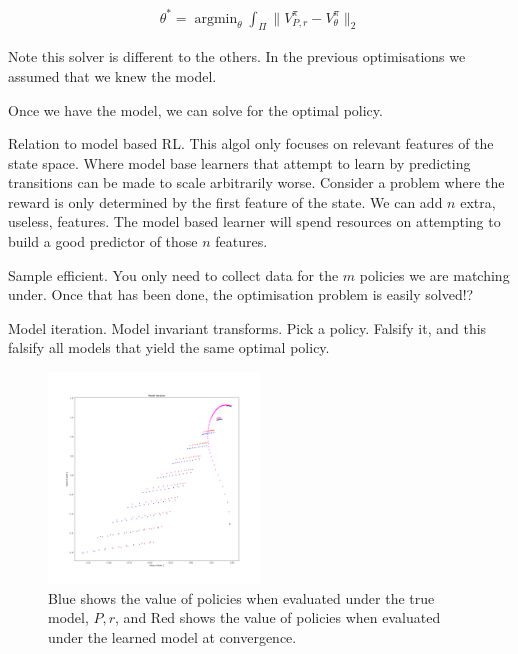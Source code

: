\begin{align}
\theta^{* } = \mathop{\text{argmin}}_{\theta} \int_{\Pi} \parallel V^{\pi}_{P, r} -V^{\pi}_{\theta} \parallel_2
\end{align}

Note this solver is different to the others. In the previous optimisations we assumed that we knew the model.


Once we have the model, we can solve for the optimal policy.

Relation to model based RL. This algol only focuses on relevant features of the state space.
Where model base learners that attempt to learn by predicting transitions can be made to scale arbitrarily worse.
Consider a problem where the reward is only determined by the first feature of the state. We can add $n$ extra, useless, features.
The model based learner will spend resources on attempting to build a good predictor of those $n$ features.

Sample efficient. You only need to collect data for the $m$ policies we are matching under.
Once that has been done, the optimisation problem is easily solved!?

Model iteration. Model invariant transforms. Pick a policy. Falsify it,
and this falsify all models that yield the same optimal policy.

\begin{figure}
\centering
\includegraphics[width=0.5\textwidth,height=0.5\textheight]{../../pictures/figures/model_iteration.png}
\caption{Blue shows the value of policies when evaluated under the true model, $P, r$,
and Red shows the value of policies when evaluated under the learned model at convergence.}
\end{figure}


